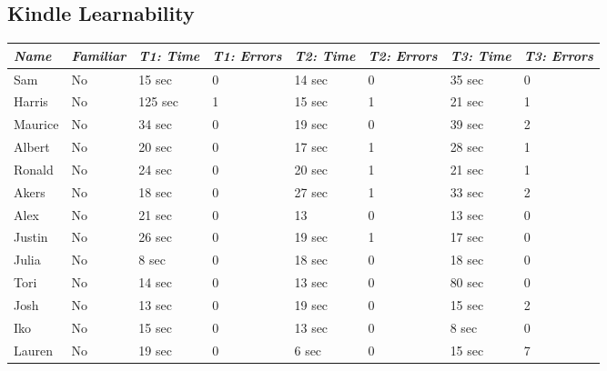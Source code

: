 \documentclass[journal,letterpaper]{article}
\begin{document}
    \subsection{Kindle Learnability}
    \begin{center}
        \centering
        \begin{tabular}{|l|l|l|l|l|l|l|l|}
            \hline
            \emph{Name} & \emph{Familiar} & \emph{T1: Time} & \emph{T1: Errors} & \emph{T2: Time} & \emph{T2: Errors} & \emph{T3: Time} & \emph{T3: Errors} \\
            \hline
            Sam & No & 15 sec & 0 & 14 sec & 0 & 35 sec & 0 \\
            \hline
            Harris & No & 125 sec & 1 & 15 sec & 1 & 21 sec & 1 \\
            \hline
            Maurice & No & 34 sec & 0 & 19 sec & 0 & 39 sec & 2 \\
            \hline
            Albert & No & 20 sec & 0 & 17 sec & 1 & 28 sec & 1 \\
            \hline
            Ronald & No & 24 sec & 0 & 20 sec & 1 & 21 sec & 1 \\
            \hline
            Akers & No & 18 sec & 0 & 27 sec & 1 & 33 sec & 2 \\
            \hline
            Alex & No & 21 sec & 0 & 13 & 0 & 13 sec & 0 \\
            \hline
            Justin & No & 26 sec & 0 & 19 sec & 1 & 17 sec & 0 \\
            \hline
            Julia & No & 8 sec & 0 & 18 sec & 0 & 18 sec & 0 \\
            \hline
            Tori & No & 14 sec & 0 & 13 sec & 0 & 80 sec & 0 \\
            \hline
            Josh & No & 13 sec & 0 & 19 sec & 0 & 15 sec & 2 \\
            \hline
            Iko & No & 15 sec & 0 & 13 sec & 0 & 8 sec & 0 \\
            \hline
            Lauren & No & 19 sec & 0 & 6 sec & 0 & 15 sec & 7 \\
        \end{tabular}
    \end{center}
\end{document}
